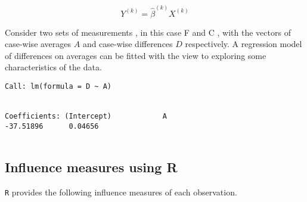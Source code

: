 \documentclass[00-MASTER.tex]{subfiles}
\begin{document}
\begin{equation}
	Y^{(k)} = \hat{\beta}^{(k)}X^{(k)}
\end{equation}


Consider two sets of measurements , in this case F and C , with the vectors of case-wise averages $A$ and case-wise differences $D$ respectively. A regression model of differences on averages can be fitted with the view to exploring some characteristics of the data.


\begin{verbatim}
Call: lm(formula = D ~ A)


Coefficients: (Intercept)            A
-37.51896      0.04656


\end{verbatim}








%
%


\subsection{Influence measures using R} %
\texttt{R} provides the following influence measures of each observation.


\end{document}
